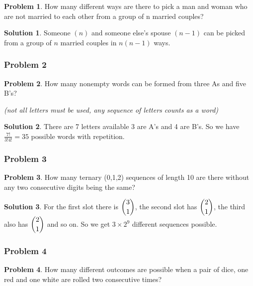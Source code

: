 \documentclass[10pt,a4paper,titlepage,twoside,draft]{article}
\theoremstyle{plain}
\theoremstyle{definition}
\newtheorem*{prob}{Problem}
\newtheorem*{sol}{Solution}
\theoremstyle{remark}
\begin{document}
\begin{prob}
    How many different ways are there to pick a man and woman who are not married to each other from a group of n married couples? 
\end{prob}  

\medskip

\begin{sol}
    Someone $(n)$ and someone else's spouse $(n-1)$ can be picked from a group of $n$ married couples in $n(n-1)$ ways. 
\end{sol}

\subsubsection{Problem 2} 

\begin{prob}
    How many nonempty words can be formed from three As and five B’s?

\textit{(not all letters must be used, any sequence of letters counts as a word)}
\end{prob}
 
 \medskip
 
\begin{sol}
    There are 7 letters available 3 are A's and 4 are B's.
So we have $\frac{7!}{3!4!} = 35$ possible words with repetition. 
\end{sol}
 
\subsubsection{Problem 3} 
 
\begin{prob}
    How many ternary (0,1,2) sequences of length 10 are there without any two consecutive digits being the same?
\end{prob}

\medskip

\begin{sol}
    For the first slot there is $\dbinom{3}{1}$, the second slot has $\dbinom{2}{1}$, the third also has $\dbinom{2}{1}$ and so on. 
So we get $3 \times 2^{9}$ different sequences possible. 
\end{sol}

\subsubsection{Problem 4}


\begin{prob}
    How many different outcomes are possible when a pair of dice, one red and one white are rolled two consecutive times?
\end{prob}
\end{document}
